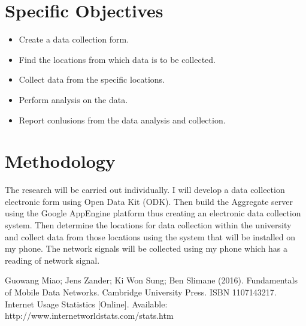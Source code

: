 \documentclass{article}
\begin{document}
\section{Specific Objectives}
\begin{itemize}
\item
Create a data collection form.
\item
Find the locations from which data is to be collected.
\item
Collect data from the specific locations.
\item
Perform analysis on the data.
\item
Report conlusions from the data analysis and collection.
\end{itemize}

\section{Methodology}
The research will be carried out individually. I will develop a data collection electronic form using Open Data Kit (ODK). Then build the Aggregate server using the Google AppEngine platform thus creating an electronic data collection system. Then determine the locations for data collection within the university and collect data from those locations using the system that will be installed on my phone. The network signals will be collected using my phone which has a reading of network signal.



\begin{thebibliography}{9}
Guowang Miao; Jens Zander; Ki Won Sung; Ben Slimane (2016). Fundamentals of Mobile Data Networks. Cambridge University Press. ISBN 1107143217.
Internet Usage Statistics [Online].  Available: http://www.internetworldstats.com/stats.htm
\end{thebibliography}
\end{document}
